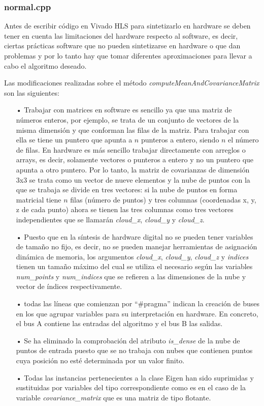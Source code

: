 \subsubsection{normal.cpp}
Antes de escribir código en Vivado HLS para sintetizarlo en hardware se deben tener en cuenta las limitaciones del hardware respecto al software, es decir, ciertas prácticas software que no pueden sintetizarse en hardware o que dan problemas y por lo tanto hay que tomar diferentes aproximaciones para llevar a cabo el algoritmo deseado.

Las modificaciones realizadas sobre el método \textit{computeMeanAndCovarianceMatrix} son las siguientes:

\begin{itemize}
\item[•] Trabajar con matrices en software es sencillo ya que una matriz de números enteros, por ejemplo, se trata de un conjunto de vectores de la misma dimensión y que conforman las filas de la matriz. Para trabajar con ella se tiene un puntero que apunta a $n$ punteros a entero, siendo $n$ el número de filas. En hardware es más sencillo trabajar directamente con arreglos o arrays, es decir, solamente vectores o punteros a entero y no un puntero que apunta a otro puntero. Por lo tanto, la matriz de covarianzas de dimensión 3x3 se trata como un vector de nueve elementos y la nube de puntos con la que se trabaja se divide en tres vectores: si la nube de puntos en forma matricial tiene $n$ filas (número de puntos) y tres columnas (coordenadas x, y, z de cada punto) ahora se tienen las tres columnas como tres vectores independientes que se llamarán \textit{cloud\_x}, \textit{cloud\_y} y \textit{cloud\_z}.

\item[•] Puesto que en la síntesis de hardware digital no se pueden tener variables de tamaño no fijo, es decir, no se pueden manejar herramientas de asignación dinámica de memoria, los argumentos \textit{cloud\_x}, \textit{cloud\_y}, \textit{cloud\_z} y \textit{indices} tienen un tamaño máximo del cual se utiliza el necesario según las variables \textit{num\_points} y \textit{num\_indices} que se refieren a las dimensiones de la nube y vector de índices respectivamente.

\item[•] todas las líneas que comienzan por ``\#pragma'' indican la creación de buses en los que agrupar variables para su interpretación en hardware. En concreto, el bus A contiene las entradas del algoritmo y el bus B las salidas. 

\item[•] Se ha eliminado la comprobación del atributo \textit{is\_dense} de la nube de puntos de entrada puesto que se no trabaja con nubes que contienen puntos cuya posición no esté determinada por un valor finito.

\item[•] Todas las instancias pertenecientes a la clase Eigen han sido suprimidas y sustituidas por variables del tipo correspondiente como es en el caso de la variable \textit{covariance\_matrix} que es una matriz de tipo flotante.

\end{itemize}

